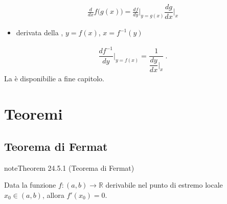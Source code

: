 \documentclass[letterpaper,10pt,italian]{jupyterBook}
\begin{document}
\begin{equation}\label{equation:ch/infinitesimal_calculus/derivatives:infinitesimal-calculus:derivatives:rules:composite}
\begin{split}\frac{d}{dx} f\big( g(x) \big) = \frac{d f}{dy}\Big|_{y=g(x)} \dfrac{d g}{d x}\Big|_{x}\end{split}
\end{equation}\begin{itemize}
\item {} 
\sphinxAtStartPar
derivata della {\hyperref[\detokenize{ch/precalculus/real-functions:math-hs-precalculus-real-functions-inverse}]{}}, \(y = f(x)\), \(x = f^{-1}(y)\)

\end{itemize}
\begin{equation}\label{equation:ch/infinitesimal_calculus/derivatives:infinitesimal-calculus:derivatives:rules:inverse}
\begin{split} \dfrac{d f^{-1}}{d y}\bigg|_{y = f(x)} = \dfrac{1}{ \dfrac{d y}{d x}\bigg|_{x}} \ .\end{split}
\end{equation}
\sphinxAtStartPar
La {\hyperref[\detokenize{ch/infinitesimal_calculus/derivatives-notes:infinitesimal-calculus-derivatives-rules-notes}]{}} è disponibilie a fine capitolo.


\section{Teoremi}
\label{\detokenize{ch/infinitesimal_calculus/derivatives:teoremi}}\label{\detokenize{ch/infinitesimal_calculus/derivatives:infinitesimal-calculus-derivatives-thm}}

\subsection{Teorema di Fermat}
\label{\detokenize{ch/infinitesimal_calculus/derivatives:teorema-di-fermat}}\label{\detokenize{ch/infinitesimal_calculus/derivatives:infinitesimal-calculus-derivatives-thm-fermat}}\label{ch/infinitesimal_calculus/derivatives:thm:infinitesimal-calculus:derivatives:thm:fermat}
\begin{sphinxadmonition}{note}{Theorem 24.5.1 (Teorema di Fermat)}



\sphinxAtStartPar
Data la funzione \(f: (a,b) \rightarrow \mathbb{R}\) derivabile nel punto di estremo locale \(x_0 \in (a,b)\), allora \(f'(x_0) = 0\).
\end{sphinxadmonition}
\end{document}
